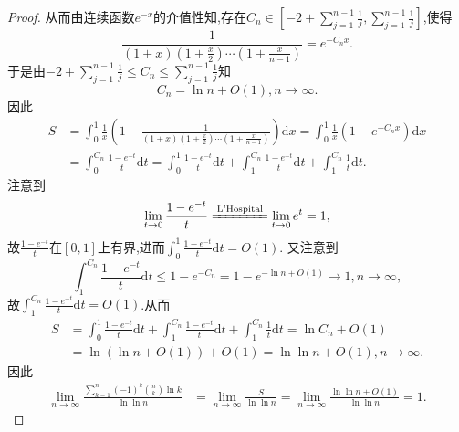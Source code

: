 \documentclass[../../main.tex]{subfiles}
\begin{document}
\begin{proof}
从而由连续函数$e^{-x}$的介值性知,存在$C_n\in \left[ -2+\sum_{j=1}^{n-1}{\frac{1}{j}},\sum_{j=1}^{n-1}{\frac{1}{j}} \right]$,使得
$$\frac{1}{(1+x)\left(1+\frac{x}{2}\right)\cdots\left(1+\frac{x}{n-1}\right)}=e^{-C_nx}.$$
于是由$-2+\sum_{j=1}^{n-1}{\frac{1}{j}}\leqslant C_n\leqslant \sum_{j=1}^{n-1}{\frac{1}{j}}$知
$$C_n=\ln n+O(1),n\rightarrow \infty.$$
因此
\begin{align*}
S&=\int_0^1{\frac{1}{x}\left( 1-\frac{1}{(1+x)\left(1+\frac{x}{2}\right)\cdots\left(1+\frac{x}{n-1}\right)} \right) \mathrm{d}x}=\int_0^1{\frac{1}{x}\left( 1-e^{-C_nx} \right) \mathrm{d}x}
\\
&=\int_0^{C_n}{\frac{1-e^{-t}}{t}\mathrm{d}t}=\int_0^1{\frac{1-e^{-t}}{t}\mathrm{d}t}+\int_1^{C_n}{\frac{1-e^{-t}}{t}\mathrm{d}t}+\int_1^{C_n}{\frac{1}{t}\mathrm{d}t}.
\end{align*}
注意到
$$\lim_{t\rightarrow 0}\frac{1-e^{-t}}{t}\xlongequal{\text{L'Hospital}}\lim_{t\rightarrow 0}e^t=1,$$
故$\frac{1-e^{-t}}{t}$在$[0,1]$上有界,进而$\int_0^1{\frac{1-e^{-t}}{t}\mathrm{d}t}=O(1)$.
又注意到
$$\int_1^{C_n}{\frac{1-e^{-t}}{t}\mathrm{d}t}\leqslant 1-e^{-C_n}=1-e^{-\ln n+O(1)}\rightarrow 1,n\rightarrow \infty,$$
故$\int_1^{C_n}{\frac{1-e^{-t}}{t}\mathrm{d}t}=O(1)$.从而
\begin{align*}
S&=\int_0^1{\frac{1-e^{-t}}{t}\mathrm{d}t}+\int_1^{C_n}{\frac{1-e^{-t}}{t}\mathrm{d}t}+\int_1^{C_n}{\frac{1}{t}\mathrm{d}t}=\ln C_n+O(1)
\\
&=\ln \left( \ln n+O(1) \right) +O(1)=\ln\ln n+O(1),n\rightarrow \infty.
\end{align*}
因此
\begin{align*}
\lim_{n\rightarrow \infty}\frac{\sum\limits_{k=1}^n{(-1) ^k\binom{n}{k}\ln k}}{\ln\ln n}&=\lim_{n\rightarrow \infty}\frac{S}{\ln\ln n}=\lim_{n\rightarrow \infty}\frac{\ln\ln n+O(1)}{\ln\ln n}=1.
\end{align*}
\end{proof}
\end{document}
